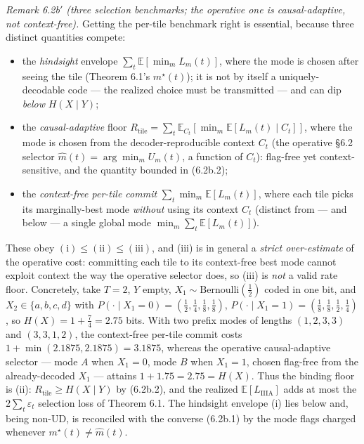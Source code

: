 \documentclass[
]{article}
\begin{document}
\emph{Remark 6.2b$'$ (three selection benchmarks; the operative one is
causal-adaptive, not context-free).} Getting the per-tile benchmark
right is essential, because three distinct quantities compete:
\begin{itemize}
\item[(i)] the \emph{hindsight} envelope $\sum_t \mathbb{E}[\min_m
  L_m(t)]$, where the mode is chosen after seeing the tile (Theorem 6.1's
  $m^\star(t)$); it is not by itself a uniquely-decodable code --- the
  realized choice must be transmitted --- and can dip \emph{below}
  $H(X\mid Y)$;
\item[(ii)] the \emph{causal-adaptive} floor $R_{\mathrm{tile}} =
  \sum_t \mathbb{E}_{C_t}[\min_m \mathbb{E}[L_m(t)\mid C_t]]$, where the
  mode is chosen from the decoder-reproducible context $C_t$ (the
  operative §6.2 selector $\hat m(t) = \arg\min_m U_m(t)$, a function of
  $C_t$): flag-free yet context-sensitive, and the quantity bounded in
  (6.2b.2);
\item[(iii)] the \emph{context-free per-tile commit} $\sum_t \min_m
  \mathbb{E}[L_m(t)]$, where each tile picks its marginally-best mode
  \emph{without} using its context $C_t$ (distinct from --- and below ---
  a single global mode $\min_m \sum_t \mathbb{E}[L_m(t)]$).
\end{itemize}
These obey $(\mathrm{i}) \le (\mathrm{ii}) \le (\mathrm{iii})$, and
(iii) is in general a \emph{strict over-estimate} of the operative cost:
committing each tile to its context-free best mode cannot exploit context
the way the operative selector does, so (iii) is \emph{not} a valid rate
floor. Concretely,
take $T = 2$, $Y$ empty, $X_1 \sim \mathrm{Bernoulli}(\tfrac12)$ coded in
one bit, and $X_2 \in \{a,b,c,d\}$ with $P(\cdot \mid X_1{=}0) =
(\tfrac12,\tfrac14,\tfrac18,\tfrac18)$, $P(\cdot \mid X_1{=}1) =
(\tfrac18,\tfrac18,\tfrac12,\tfrac14)$, so $H(X) = 1 + \tfrac74 = 2.75$
bits. With two prefix modes of lengths $(1,2,3,3)$ and $(3,3,1,2)$, the
context-free per-tile commit costs $1 + \min(2.1875, 2.1875) = 3.1875$,
whereas the operative causal-adaptive selector --- mode $A$ when
$X_1{=}0$, mode $B$ when $X_1{=}1$, chosen flag-free from the
already-decoded $X_1$ --- attains $1 + 1.75 = 2.75 = H(X)$. Thus the binding floor is (ii):
$R_{\mathrm{tile}} \ge H(X\mid Y)$ by (6.2b.2), and the realized
$\mathbb{E}[L_{\mathrm{IIIA}}]$ adds at most the $2\sum_t \varepsilon_t$
selection loss of Theorem 6.1. The hindsight envelope (i) lies below and,
being non-UD, is reconciled with the converse (6.2b.1) by the mode flags
charged whenever $m^\star(t) \ne \hat m(t)$.
\end{document}

